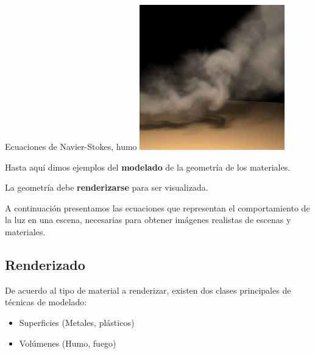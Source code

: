 \documentclass[spanish,unknownkeysallowed]{beamer}
\begin{document}
\begin{frame}{Ecuaciones de Navier-Stokes, humo}
\center
\includegraphics[width=6.3cm]{../figures/smoke}

\end{frame}

\begin{frame}

Hasta aquí dimos ejemplos del \textbf{modelado} de la geometría de los materiales.

\vspace{0.5cm}
La geometría debe \textbf{renderizarse} para ser visualizada.
\vspace{0.5cm}

A continuación presentamos las ecuaciones que representan el comportamiento de la luz en una escena, necesarias para obtener imágenes realistas de escenas y materiales.

\end{frame}

\subsection{Renderizado}

\begin{frame}
De acuerdo al tipo de material a renderizar, existen dos clases principales de técnicas de modelado:

\begin{block}{}
\begin{itemize}
\item Superficies (Metales, plásticos)
\item Volúmenes (Humo, fuego)
\end{itemize}
\end{block}
\end{frame}
\end{document}
